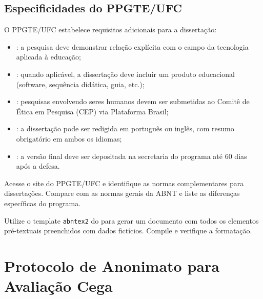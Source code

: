 \subsection{Especificidades do PPGTE/UFC}

O PPGTE/UFC estabelece requisitos adicionais para a dissertação:

\begin{itemize}
\item {}: a pesquisa deve demonstrar
      relação explícita com o campo da tecnologia aplicada à educação;
\item {}: quando aplicável, a dissertação deve
      incluir um produto educacional (software, sequência didática, guia, etc.);
\item {}: pesquisas envolvendo seres humanos devem ser
      submetidas ao Comitê de Ética em Pesquisa (CEP) via Plataforma Brasil;
\item {}: a dissertação pode ser redigida em português ou inglês,
      com resumo obrigatório em ambos os idiomas;
\item {}: a versão final deve ser depositada na
      secretaria do programa até 60 dias após a defesa.
\end{itemize}

\begin{exercicio}
    Acesse o site do PPGTE/UFC e identifique as normas complementares para
    dissertações. Compare com as normas gerais da ABNT e liste as diferenças
    específicas do programa.
\end{exercicio}

\begin{exercicio}
    Utilize o template \texttt{abntex2}{} do \opencodeeco{} para gerar um documento
    com todos os elementos pré-textuais preenchidos com dados fictícios.
    Compile e verifique a formatação.
\end{exercicio}

\section{Protocolo de Anonimato para Avaliação Cega}
\label{sec:protocolo-anonimato}
\nivelavancado

